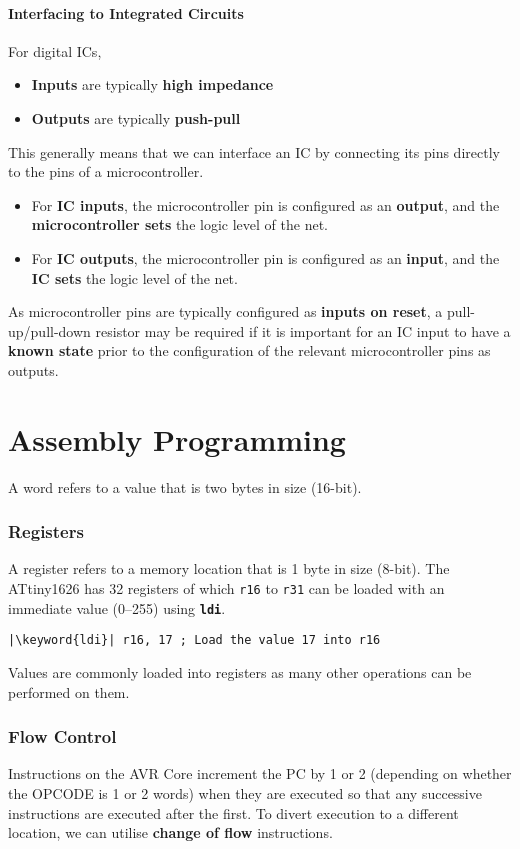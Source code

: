 \documentclass{report}
\newcommand{\keyword}[1]{\textcolor[rgb]{0.00,0.50,0.00}{\textbf{#1}}}
\newcommand{\keywordinline}[1]{\textcolor[rgb]{0.00,0.50,0.00}{\textbf{\texttt{#1}}}}
\begin{document}
\subsection{Interfacing to Integrated Circuits}
For digital ICs,
\begin{itemize}
    \item \textbf{Inputs} are typically \textbf{high impedance}
    \item \textbf{Outputs} are typically \textbf{push-pull}
\end{itemize}
This generally means that we can interface an IC by connecting its pins directly to the pins of a microcontroller.
\begin{itemize}
    \item For \textbf{IC inputs}, the microcontroller pin is configured
          as an \textbf{output}, and the \textbf{microcontroller sets}
          the logic level of the net.
    \item For \textbf{IC outputs}, the microcontroller pin is
          configured as an \textbf{input}, and the \textbf{IC sets} the
          logic level of the net.
\end{itemize}
As microcontroller pins are typically configured as \textbf{inputs on reset}, a
pull-up/pull-down resistor may be required if it is important for an IC input to
have a \textbf{known state} prior to the configuration of the relevant microcontroller pins as outputs.
\part{Assembly Programming}
\begin{definition}[Word]
    A word refers to a value that is two bytes in size (16-bit).
\end{definition}
\section{Registers}
A register refers to a memory location that is 1 byte in size (8-bit).
The ATtiny1626 has 32 registers of which \texttt{r16} to
\texttt{r31} can be loaded with an immediate value
(\numrange{0}{255}) using \keywordinline{ldi}.
\begin{verbatim}
|\keyword{ldi}| r16, 17 ; Load the value 17 into r16
\end{verbatim}
Values are commonly loaded into registers as many other operations can
be performed on them.
\section{Flow Control}
Instructions on the AVR Core increment the PC by 1 or 2 (depending on
whether the OPCODE is 1 or 2 words) when they are executed so that any
successive instructions are executed after the first. To divert
execution to a different location, we can utilise \textbf{change of
flow} instructions.
\end{document}
